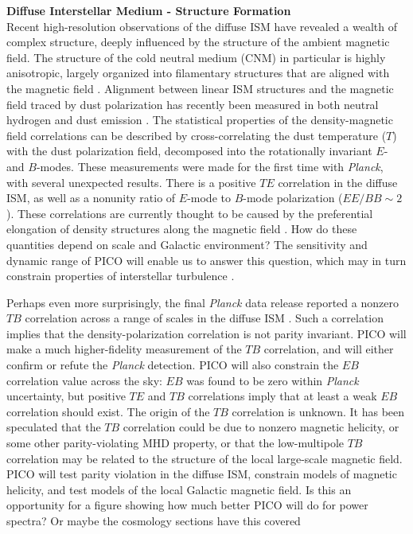 \documentclass[PICOReport.tex]{subfiles}
\begin{document}
{\bf Diffuse Interstellar Medium - Structure Formation} \\[0.3cm]
Recent high-resolution observations of the diffuse ISM have revealed a wealth of complex structure, deeply influenced by the structure of the ambient magnetic field. The structure of the cold neutral medium (CNM) in particular is highly anisotropic, largely organized into filamentary structures that are aligned with the magnetic field \citep{Clark:2014}. Alignment between linear ISM structures and the magnetic field traced by dust polarization has recently been measured in both neutral hydrogen \citep{Clark:2015, Kalberla:2016} and dust emission \citep{Planck:XXXII}. The statistical properties of the density-magnetic field correlations can be described by cross-correlating the dust temperature ($T$) with the dust polarization field, decomposed into the rotationally invariant $E$- and $B$-modes. These measurements were made for the first time with \textit{Planck}, with several unexpected results. There is a positive $TE$ correlation in the diffuse ISM, as well as a nonunity ratio of $E$-mode to $B$-mode polarization ($EE/BB \sim 2$). These correlations are currently thought to be caused by the preferential elongation of density structures along the magnetic field \citep{Clark:2015, Planck:XXXVIII}. 
How do these quantities depend on scale and Galactic environment? The sensitivity and dynamic range of PICO will enable us to answer this question, which may in turn constrain properties of interstellar turbulence \citep[e.g.,][]{Caldwell:2017, Kandel:2017}. 


Perhaps even more surprisingly, the final \textit{Planck} data release reported a nonzero $TB$ correlation across a range of scales in the diffuse ISM \citep{Planck2018:XI}. Such a correlation implies that the density-polarization correlation is not parity invariant. PICO will make a much higher-fidelity measurement of the $TB$ correlation, and will either confirm or refute the \textit{Planck} detection. PICO will also constrain the $EB$ correlation value across the sky: $EB$ was found to be zero within \textit{Planck} uncertainty, but positive $TE$ and $TB$ correlations imply that at least a weak $EB$ correlation should exist. The origin of the $TB$ correlation is unknown. It has been speculated that the $TB$ correlation could be due to nonzero magnetic helicity, or some other parity-violating MHD property, or that the low-multipole $TB$ correlation may be related to the structure of the local large-scale magnetic field. PICO will test parity violation in the diffuse ISM, constrain models of magnetic helicity, and test models of the local Galactic magnetic field. {\color{red} Is this an opportunity for a figure showing how much better PICO will do for power spectra? Or maybe the cosmology sections have this covered}
\end{document}
